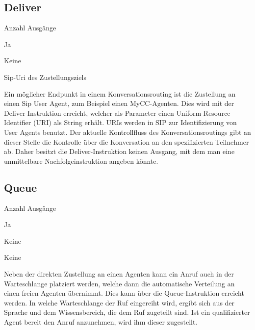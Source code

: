 \subsection{Deliver}
\label{subsec:Deliver}
\begin{labeling}{Anzahl Ausgänge}
\item [Eingang] Ja
\item [Anzahl Ausgänge] Keine
\item [Parameter] Sip-Uri des Zustellungsziels
\item [Beschreibung] Ein möglicher Endpunkt in einem Konversationsrouting ist die Zustellung an einen Sip User Agent, zum Beispiel einen MyCC-Agenten. Dies wird mit der Deliver-Instruktion erreicht, welcher als Parameter einen Uniform Resource Identifier (URI) als String erhält. URIs werden in SIP zur Identifizierung von User Agents benutzt. Der aktuelle Kontrollfluss des Konversationsroutings gibt an dieser Stelle die Kontrolle über die Konversation an den spezifizierten Teilnehmer ab. Daher besitzt die Deliver-Instruktion keinen Ausgang, mit dem man eine unmittelbare Nachfolgeinstruktion angeben könnte.
\end{labeling}

\subsection{Queue}
\label{subsec:Queue}
\begin{labeling}{Anzahl Ausgänge}
\item [Eingang] Ja
\item [Anzahl Ausgänge] Keine
\item [Parameter] Keine
\item [Beschreibung] Neben der direkten Zustellung an einen Agenten kann ein Anruf auch in der Warteschlange platziert werden, welche dann die automatische Verteilung an einen freien Agenten übernimmt. Dies kann über die Queue-Instruktion erreicht werden. In welche Warteschlange der Ruf eingereiht wird, ergibt sich aus der Sprache und dem Wissensbereich, die dem Ruf zugeteilt sind. Ist ein qualifizierter Agent bereit den Anruf anzunehmen, wird ihm dieser zugestellt.
\end{labeling}

